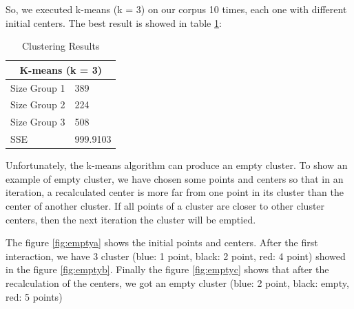 \documentclass[a4paper,11pt]{article}
\begin{document}
So, we executed k-means (k = 3) on our corpus 10 times, each one with different initial centers. The best result is showed in table \ref{tab:kmens3}:
\begin{table}[H]
  \caption{Clustering Results}
  \label{tab:kmens3}

  \begin{center}
    \begin{tabular}{|l|l|}
      \hline
      \multicolumn{2}{|c|}{K-means (k = 3)}\\
      \hline
      \hline
      Size Group 1& 389 \\
      Size Group 2& 224 \\
      Size Group 3& 508\\
      \hline
      SSE & 999.9103 \\
      \hline
    \end{tabular}
  \end{center}
\end{table}

Unfortunately, the k-means algorithm can produce an empty cluster.
To show an example  of empty cluster, we have chosen some  points and centers so
that in an iteration,  a recalculated center is more far from  one point in its
cluster than the center of another cluster. 
If all points of a cluster are closer to other cluster centers, then the next iteration the cluster will be emptied.

The figure \ref{fig:emptya} shows the initial points and centers. After the 
first interaction, we have 3 cluster (blue: 1 point, black: 2 point, red: 4
point) showed in the figure \ref{fig:emptyb}. Finally the figure \ref{fig:emptyc}
shows that after the recalculation of the
centers, we got an empty cluster (blue: 2 point, black: empty, red: 5 points)
\end{document}
